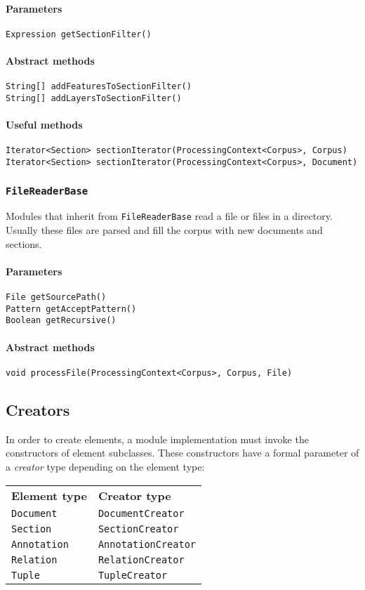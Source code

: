 \documentclass[a4paper]{article}
\begin{document}
\paragraph{Parameters}
\texttt{Expression getSectionFilter()}

\paragraph{Abstract methods}
\texttt{String[] addFeaturesToSectionFilter()}\\
\texttt{String[] addLayersToSectionFilter()}

\paragraph{Useful methods}
\texttt{Iterator<Section> sectionIterator(ProcessingContext<Corpus>, Corpus)}\\
\texttt{Iterator<Section> sectionIterator(ProcessingContext<Corpus>, Document)}

\subsubsection{\texttt{FileReaderBase}}
Modules that inherit from \texttt{FileReaderBase} read a file or files in a directory.
Usually these files are parsed and fill the corpus with new documents and sections.

\paragraph{Parameters}
\texttt{File getSourcePath()}\\
\texttt{Pattern getAcceptPattern()}\\
\texttt{Boolean getRecursive()}

\paragraph{Abstract methods}
\texttt{void processFile(ProcessingContext<Corpus>, Corpus, File)}

\subsection{Creators}
In order to create elements, a module implementation must invoke the constructors of element subclasses.
These constructors have a formal parameter of a \emph{creator} type depending on the element type:
\begin{tabular}[hptb]{ll}
  \textbf{Element type} & \textbf{Creator type}\\
  \texttt{Document}   & \texttt{DocumentCreator}\\
  \texttt{Section}    & \texttt{SectionCreator}\\
  \texttt{Annotation} & \texttt{AnnotationCreator}\\
  \texttt{Relation}   & \texttt{RelationCreator}\\
  \texttt{Tuple}      & \texttt{TupleCreator}\\
\end{tabular}
\end{document}

